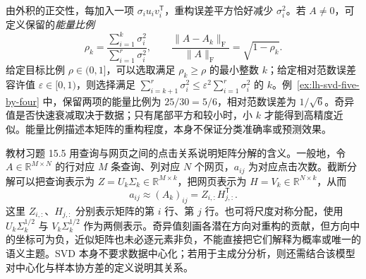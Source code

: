 由外积的正交性，每加入一项 $\sigma_i u_iv_i^{\mathsf T}$，重构误差平方恰好减少 $\sigma_i^2$。若 $A\ne0$，可定义保留的\emph{能量比例}
\begin{equation}
\rho_k=\frac{\sum_{i=1}^k\sigma_i^2}{\sum_{i=1}^r\sigma_i^2},\qquad
\frac{\|A-A_k\|_{\mathrm F}}{\|A\|_{\mathrm F}}=\sqrt{1-\rho_k}.
\label{eq:lh-svd-retained-energy}
\end{equation}
给定目标比例 $\rho\in(0,1]$，可以选取满足 $\rho_k\geq\rho$ 的最小整数 $k$；给定相对范数误差容许值 $\varepsilon\in[0,1)$，则选择满足 $\sum_{i=k+1}^r\sigma_i^2\leq\varepsilon^2\sum_{i=1}^r\sigma_i^2$ 的 $k$。例~\ref{ex:lh-svd-five-by-four} 中，保留两项的能量比例为 $25/30=5/6$，相对范数误差为 $1/\sqrt6$。奇异值是否快速衰减取决于数据；只有尾部平方和较小时，小 $k$ 才能得到高精度近似。能量比例描述本矩阵的重构程度，本身不保证分类准确率或预测效果。

教材习题 15.5 用查询与网页之间的点击关系说明矩阵分解的含义。一般地，令 $A\in\mathbb R^{M\times N}$ 的行对应 $M$ 条查询、列对应 $N$ 个网页，$a_{ij}$ 为对应点击次数。截断分解可以把查询表示为 $Z=U_k\Sigma_k\in\mathbb R^{M\times k}$，把网页表示为 $H=V_k\in\mathbb R^{N\times k}$，从而
\[
a_{ij}\approx (A_k)_{ij}=Z_{i,:}H_{j,:}^{\mathsf T}.
\]
这里 $Z_{i,:}$、$H_{j,:}$ 分别表示矩阵的第 $i$ 行、第 $j$ 行。也可将尺度对称分配，使用 $U_k\Sigma_k^{1/2}$ 与 $V_k\Sigma_k^{1/2}$ 作为两侧表示。奇异值刻画各潜在方向对重构的贡献，但方向中的坐标可为负，近似矩阵也未必逐元素非负，不能直接把它们解释为概率或唯一的语义主题。SVD 本身不要求数据中心化；若用于主成分分析，则还需结合该模型对中心化与样本协方差的定义说明其关系。





